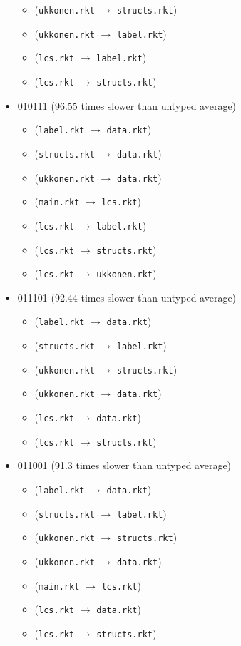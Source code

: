 \documentclass{article}
\newcommand{\mono}[1]{\texttt{#1}}
\begin{document}
\begin{itemize}
\begin{itemize}
  \item (\mono{ukkonen.rkt} $\rightarrow$ \mono{structs.rkt})
  \item (\mono{ukkonen.rkt} $\rightarrow$ \mono{label.rkt})
  \item (\mono{lcs.rkt} $\rightarrow$ \mono{label.rkt})
  \item (\mono{lcs.rkt} $\rightarrow$ \mono{structs.rkt})
  \end{itemize}
\item 010111 (96.55 times slower than untyped average)
  \begin{itemize}
  \item (\mono{label.rkt} $\rightarrow$ \mono{data.rkt})
  \item (\mono{structs.rkt} $\rightarrow$ \mono{data.rkt})
  \item (\mono{ukkonen.rkt} $\rightarrow$ \mono{data.rkt})
  \item (\mono{main.rkt} $\rightarrow$ \mono{lcs.rkt})
  \item (\mono{lcs.rkt} $\rightarrow$ \mono{label.rkt})
  \item (\mono{lcs.rkt} $\rightarrow$ \mono{structs.rkt})
  \item (\mono{lcs.rkt} $\rightarrow$ \mono{ukkonen.rkt})
  \end{itemize}
\item 011101 (92.44 times slower than untyped average)
  \begin{itemize}
  \item (\mono{label.rkt} $\rightarrow$ \mono{data.rkt})
  \item (\mono{structs.rkt} $\rightarrow$ \mono{label.rkt})
  \item (\mono{ukkonen.rkt} $\rightarrow$ \mono{structs.rkt})
  \item (\mono{ukkonen.rkt} $\rightarrow$ \mono{data.rkt})
  \item (\mono{lcs.rkt} $\rightarrow$ \mono{data.rkt})
  \item (\mono{lcs.rkt} $\rightarrow$ \mono{structs.rkt})
  \end{itemize}
\item 011001 (91.3 times slower than untyped average)
  \begin{itemize}
  \item (\mono{label.rkt} $\rightarrow$ \mono{data.rkt})
  \item (\mono{structs.rkt} $\rightarrow$ \mono{label.rkt})
  \item (\mono{ukkonen.rkt} $\rightarrow$ \mono{structs.rkt})
  \item (\mono{ukkonen.rkt} $\rightarrow$ \mono{data.rkt})
  \item (\mono{main.rkt} $\rightarrow$ \mono{lcs.rkt})
  \item (\mono{lcs.rkt} $\rightarrow$ \mono{data.rkt})
  \item (\mono{lcs.rkt} $\rightarrow$ \mono{structs.rkt})
  \end{itemize}


\end{itemize}
\end{document}
